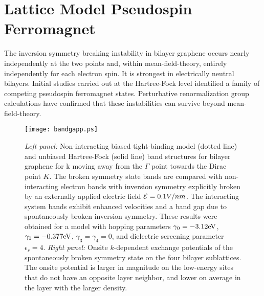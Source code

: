 \documentclass[twocolumn,prb,showpacs,preprintnumbers,amsmath,amssymb]{revtex4}
\begin{document}
\section{Lattice Model Pseudospin Ferromagnet}
The inversion symmetry breaking instability in bilayer graphene 
occurs nearly independently at the two points and, within mean-field-theory,
entirely independently for each electron spin. \cite{pmag}
It is strongest in electrically neutral bilayers.\cite{hongki,fanzhang,yang,nandkishore1}
Initial studies carried out at the Hartree-Fock level \cite{pmag}
identified a family of competing pseudospin ferromagnet states.
Perturbative renormalization group calculations \cite{fanzhang,yang,fradkin} have 
confirmed that these instabilities can survive beyond mean-field-theory.
\begin{figure}[htbp]
\begin{center}
\texttt{[image: bandgapp.ps]} 
\caption{
{\em Left panel:}
Non-interacting biased tight-binding model (dotted line) and unbiased
Hartree-Fock (solid line)  
band structures for bilayer graphene for k moving away from the 
$\Gamma$ point towards the Dirac point $K$.
The broken symmetry state bands are compared with non-interacting 
electron bands with inversion symmetry explicitly broken by an externally applied
electric field ${\cal E} = 0.1 V/nm$.
The interacting system bands exhibit enhanced velocities and a
band gap due to 
spontaneously broken inversion symmetry.
These results were obtained for a model with hopping parameters 
$\gamma_0=-3.12 {\rm eV}$, $\gamma_1=-0.377 {\rm eV}$, 
$\gamma_3=\gamma_4 = 0$, and dielectric screening parameter $\epsilon_r = 4$.
{\em Right panel:}
Onsite $k$-dependent exchange potentials of the spontaneously broken symmetry state on the four bilayer sublattices.
The onsite potential is larger in magnitude on the 
low-energy sites that do not have an opposite layer neighbor, and 
lower on average in the layer with the larger density.  
}
\label{figure_pmag}
\end{center}
\end{figure}
\end{document}
